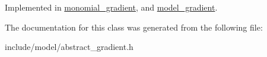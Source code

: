 Implemented in \hyperlink{classmonomial__gradient_a718fe4bdf3a6edd32d655de03db8badf}{monomial\-\_\-gradient}, and \hyperlink{classmodel__gradient_a3342773b28b53352dfd08abd25b946f6}{model\-\_\-gradient}.



The documentation for this class was generated from the following file\-:\begin{DoxyCompactItemize}
\item 
include/model/abstract\-\_\-gradient.\-h\end{DoxyCompactItemize}
